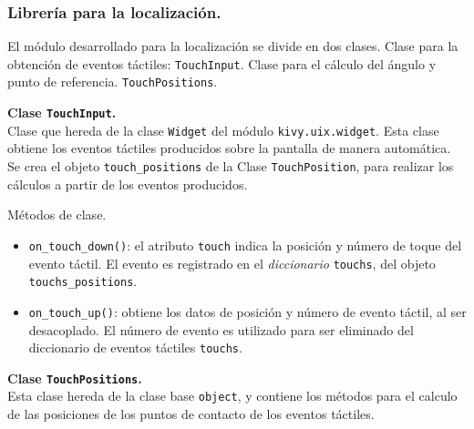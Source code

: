 \subsubsection{Librería para la localización.}
El módulo desarrollado para la localización se divide en dos clases.
Clase para la obtención de eventos táctiles: \texttt{TouchInput}.
Clase para el cálculo del ángulo y punto de referencia. \texttt{TouchPositions}.

\textbf{Clase \texttt{TouchInput}.}\\ 
Clase que hereda de la clase \texttt{Widget} del módulo \texttt{kivy.uix.widget}. Esta clase obtiene los eventos táctiles producidos sobre la pantalla de manera automática. Se crea el objeto \texttt{touch\_positions} de la Clase \texttt{TouchPosition}, para realizar los cálculos a partir de los eventos producidos.

Métodos de clase.
\begin{itemize}
\item \texttt{on\_touch\_down()}: el atributo \texttt{touch} indica la posición y número de toque del evento táctil. El evento es registrado en el \emph{diccionario} \texttt{touchs}, del objeto \texttt{touchs\_positions}.

\item \texttt{on\_touch\_up()}: obtiene los datos de posición y número de evento táctil, al ser desacoplado. El número de evento es utilizado para ser eliminado del diccionario de eventos táctiles \texttt{touchs}.
\end{itemize}
\textbf{Clase \texttt{TouchPositions}.}\\ 
Esta clase hereda de la clase base \texttt{object}, y contiene los métodos para el calculo de las posiciones de los puntos de contacto de los eventos táctiles.

